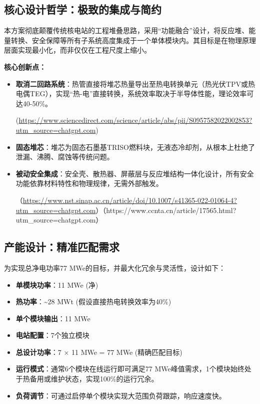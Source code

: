 \subsection{核心设计哲学：极致的集成与简约}\label{ux6838ux5fc3ux8bbeux8ba1ux54f2ux5b66ux6781ux81f4ux7684ux96c6ux6210ux4e0eux7b80ux7ea6}

本方案彻底颠覆传统核电站的工程堆叠思路，采用``功能融合''设计，将反应堆、能量转换、安全保障等所有子系统高度集成于一个单体模块内。其目标是在物理原理层面实现最小化，而非仅仅在工程尺度上缩小。

\textbf{核心创新点：}

\begin{itemize}
\item
  \textbf{取消二回路系统}：热管直接将堆芯热量导出至热电转换单元（热光伏TPV或热电偶TEG），实现``热-电''直接转换，系统效率取决于半导体性能，理论效率可达40-50\%。

(\url{https://www.sciencedirect.com/science/article/abs/pii/S0957582022002853?utm\_source=chatgpt.com})
\item
  \textbf{固态堆芯}：堆芯为固态石墨基TRISO燃料块，无液态冷却剂，从根本上杜绝了泄漏、沸腾、腐蚀等传统问题。
\item
  \textbf{被动安全集成}：安全壳、散热器、屏蔽层与反应堆结构一体化设计，所有安全功能依靠材料特性和物理规律，无需外部触发。

（\url{https://www.nst.sinap.ac.cn/article/doi/10.1007/s41365-022-01064-4?utm\_source=chatgpt.com}）（https://www.ccnta.cn/article/17565.html?utm\_source=chatgpt.com）
\end{itemize}

\subsection{产能设计：精准匹配需求}\label{ux4ea7ux80fdux8bbeux8ba1ux7cbeux51c6ux5339ux914dux9700ux6c42}

为实现总净电功率77 MWe的目标，并最大化冗余与灵活性，设计如下：

\begin{itemize}
\item
  \textbf{单模块功率}：11 MWe (净)
\item
  \textbf{热功率}：\textasciitilde28 MWt (假设直接热电转换效率为40\%)
\item
  \textbf{单个模块输出}：11 MWe
\item
  \textbf{电站配置}：7个独立模块
\item
  \textbf{总设计功率}：7 × 11 MWe = 77 MWe (精确匹配目标)
\item
  \textbf{运行模式}：通常6个模块在线运行即可满足77 MWe峰值需求，1个模块始终处于热备用或维护状态，实现100\%的运行冗余。
\item
  \textbf{负荷调节}：可通过启停单个模块实现大范围负荷跟踪，响应速度快。
\end{itemize}

